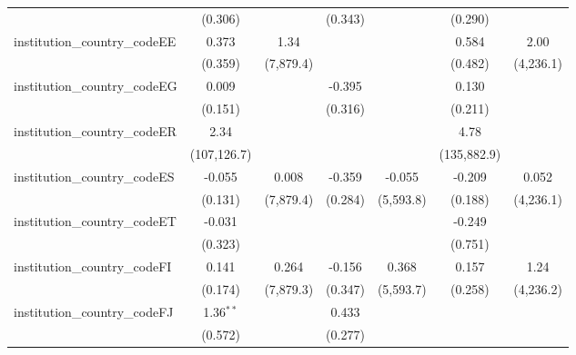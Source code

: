 \begin{tabular}{lcccccc}
                                         & (0.306)        &               & (0.343)        &               & (0.290)        &   \\   
   institution\_country\_codeEE          & 0.373          & 1.34          &                &               & 0.584          & 2.00\\   
                                         & (0.359)        & (7,879.4)     &                &               & (0.482)        & (4,236.1)\\   
   institution\_country\_codeEG          & 0.009          &               & -0.395         &               & 0.130          &   \\   
                                         & (0.151)        &               & (0.316)        &               & (0.211)        &   \\   
   institution\_country\_codeER          & 2.34           &               &                &               & 4.78           &   \\   
                                         & (107,126.7)    &               &                &               & (135,882.9)    &   \\   
   institution\_country\_codeES          & -0.055         & 0.008         & -0.359         & -0.055        & -0.209         & 0.052\\   
                                         & (0.131)        & (7,879.4)     & (0.284)        & (5,593.8)     & (0.188)        & (4,236.1)\\   
   institution\_country\_codeET          & -0.031         &               &                &               & -0.249         &   \\   
                                         & (0.323)        &               &                &               & (0.751)        &   \\   
   institution\_country\_codeFI          & 0.141          & 0.264         & -0.156         & 0.368         & 0.157          & 1.24\\   
                                         & (0.174)        & (7,879.3)     & (0.347)        & (5,593.7)     & (0.258)        & (4,236.2)\\   
   institution\_country\_codeFJ          & 1.36$^{**}$    &               & 0.433          &               &                &   \\   
                                         & (0.572)        &               & (0.277)        &               &                &   \\   

\end{tabular}
